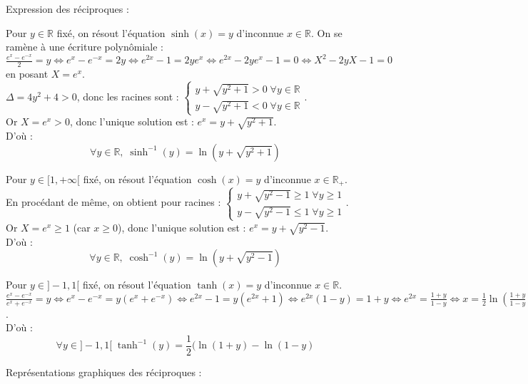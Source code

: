 \documentclass[10pt,a4paper]{article}
\begin{document}
\q Expression des réciproques :

\bigskip
{}

Pour $y \in \mathbb{R}$ fixé, on résout l'équation $\sinh(x) = y$ d'inconnue $x \in \mathbb{R}$. On
se ramène à une écriture polynômiale :\\
$\frac{e^x - e^{-x}}{2} = y \iff e^x - e^{-x} = 2y \iff e^{2x} - 1 = 2y e^x \iff e^{2x} - 2y e^x - 1
 = 0 \iff X^2 - 2y X - 1 = 0$ en posant $X = e^x$.\\
 $\Delta = 4 y^2 + 4 > 0$, donc les racines sont : $ \begin{cases} y + \sqrt{y^2 + 1} > 0 \; \forall
 y \in \mathbb{R}\\
 y - \sqrt{y^2 + 1} < 0 \; \forall y \in \mathbb{R} \end{cases}$.\\
 Or $X = e^x > 0$, donc l'unique solution est : $e^x = y + \sqrt{y^2 + 1}$.\\
 D'où :
 $$\forall y \in \mathbb{R},\; \sinh^{-1}(y) = \ln(y + \sqrt{y^2+1})$$

\bigskip
{}

Pour $y \in [1,+\infty[$ fixé, on résout l'équation $\cosh(x) = y$ d'inconnue $x \in
\mathbb{R}_+$.\\
En procédant de même, on obtient pour racines :
$ \begin{cases} y + \sqrt{y^2 - 1} \geq 1 \; \forall
 y \geq 1 \\
 y - \sqrt{y^2 - 1} \leq 1 \; \forall y \geq 1 \end{cases}$.\\
 Or $X = e^x \geq 1$ (car $x \geq 0$), donc l'unique solution est : $e^x = y + \sqrt{y^2 - 1}$.\\
 D'où :
$$\forall y \in \mathbb{R},\; \cosh^{-1}(y) = \ln(y + \sqrt{y^2-1})$$

\bigskip
{}

Pour $y \in ]-1,1[$ fixé, on résout l'équation $\tanh(x) = y$ d'inconnue $x \in \mathbb{R}$.\\
$\frac{e^x - e^{-x}}{e^x + e^{-x}} = y \iff e^x - e^{-x} = y(e^x + e^{-x}) \iff e^{2x} - 1 = y
 (e^{2x} + 1) \iff e^{2x}(1 - y) = 1 + y \iff e^{2x} = \frac{1 + y}{1 - y} \iff x =
 \frac{1}{2}\ln\left(\frac{1 + y}{1 - y}\right)$.\\
 D'où :
 $$\forall y \in ]-1,1[\; \tanh^{-1}(y) = \frac{1}{2}(\ln(1+y) - \ln(1-y)$$

\q Représentations graphiques des réciproques :
\end{document}
